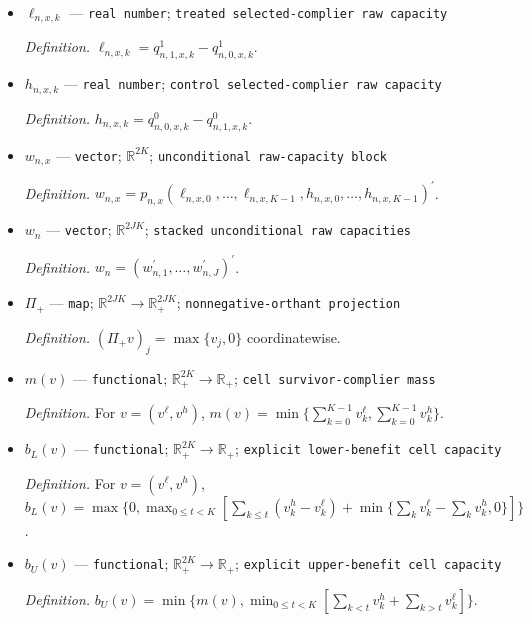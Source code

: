 \documentclass{article}
\begin{document}
\begin{itemize}
  \par\smallskip\noindent\emph{Definition.} \(f_{d,n,x,k}=P_n\{Y_{n1}(d)=k\mid X_{n1}=x\}\).
  \item \(\ell_{n,x,k}\) --- \texttt{real number}; \texttt{treated selected-\allowbreak{}complier raw capacity}
  \par\smallskip\noindent\emph{Definition.} \(\ell_{n,x,k}=q^{1}_{n,1,x,k}-q^{1}_{n,0,x,k}\).
  \item \(h_{n,x,k}\) --- \texttt{real number}; \texttt{control selected-\allowbreak{}complier raw capacity}
  \par\smallskip\noindent\emph{Definition.} \(h_{n,x,k}=q^{0}_{n,0,x,k}-q^{0}_{n,1,x,k}\).
  \item \(w_{n,x}\) --- \texttt{vector}; \(\mathbb R^{2K}\); \texttt{unconditional raw-\allowbreak{}capacity block}
  \par\smallskip\noindent\emph{Definition.} \(w_{n,x}=p_{n,x}(\ell_{n,x,0},\ldots,\ell_{n,x,K-1},h_{n,x,0},\ldots,h_{n,x,K-1})^{\prime}\).
  \item \(w_n\) --- \texttt{vector}; \(\mathbb R^{2JK}\); \texttt{stacked unconditional raw capacities}
  \par\smallskip\noindent\emph{Definition.} \(w_n=(w_{n,1}^{\prime},\ldots,w_{n,J}^{\prime})^{\prime}\).
  \item \(\Pi_+\) --- \texttt{map}; \(\mathbb R^{2JK}\to\mathbb R_+^{2JK}\); \texttt{nonnegative-\allowbreak{}orthant projection}
  \par\smallskip\noindent\emph{Definition.} \((\Pi_+v)_j=\max\{v_j,0\}\) coordinatewise.
  \item \(m(v)\) --- \texttt{functional}; \(\mathbb R_+^{2K}\to\mathbb R_+\); \texttt{cell survivor-\allowbreak{}complier mass}
  \par\smallskip\noindent\emph{Definition.} For \(v=(v^{\ell},v^h)\), \(m(v)=\min\{\sum_{k=0}^{K-1}v^{\ell}_k,\sum_{k=0}^{K-1}v^h_k\}\).
  \item \(b_L(v)\) --- \texttt{functional}; \(\mathbb R_+^{2K}\to\mathbb R_+\); \texttt{explicit lower-\allowbreak{}benefit cell capacity}
  \par\smallskip\noindent\emph{Definition.} For \(v=(v^{\ell},v^h)\), \(b_L(v)=\max\{0,\max_{0\le t<K}[\sum_{k\le t}(v^h_k-v^{\ell}_k)+\min\{\sum_k v^{\ell}_k-\sum_k v^h_k,0\}]\}\).
  \item \(b_U(v)\) --- \texttt{functional}; \(\mathbb R_+^{2K}\to\mathbb R_+\); \texttt{explicit upper-\allowbreak{}benefit cell capacity}
  \par\smallskip\noindent\emph{Definition.} \(b_U(v)=\min\{m(v),\min_{0\le t<K}[\sum_{k<t}v^h_k+\sum_{k>t}v^{\ell}_k]\}\).

\end{itemize}
\end{document}
